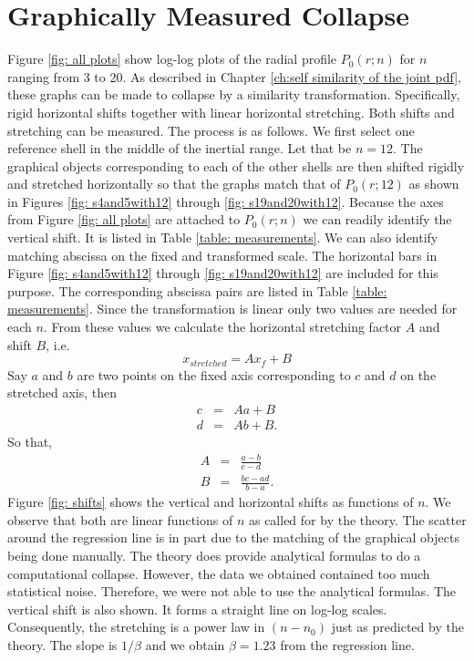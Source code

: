 \vspace{2in}

\section{Graphically Measured Collapse}

Figure \ref{fig: all plots} show log-log plots of the radial profile $P_0(r;n)$ for $n$ ranging from 3 to 20.  As described in Chapter \ref{ch:self similarity of the joint pdf}, these graphs can be made to collapse by a similarity transformation.  Specifically, rigid horizontal shifts together with linear horizontal stretching.  Both shifts and stretching can be measured.  The process is as follows.  We first select one reference shell in the middle of the inertial range.  Let that be $n=12$.  The graphical objects corresponding to each of the other shells are then shifted rigidly and stretched horizontally so that the graphs match that of $P_0(r;12)$ as shown in Figures \ref{fig: s4and5with12} through \ref{fig: s19and20with12}.  Because the axes from Figure \ref{fig: all plots} are attached to $P_0(r;n)$ we can readily identify the vertical shift.  It is listed in Table \ref{table: measurements}.  We can also identify matching abscissa on the fixed and transformed scale.  The horizontal bars in Figure \ref{fig: s4and5with12} through \ref{fig: s19and20with12} are included for this purpose.  The corresponding abscissa pairs are listed in Table \ref{table: measurements}.  Since the transformation is linear only two values are needed for each $n$.  From these values we calculate the horizontal stretching factor $A$ and shift $B$, i.e.
\begin{equation}
	x_{stretched} = Ax_{f} + B
\end{equation}
Say $a$ and $b$ are two points on the fixed axis corresponding to $c$ and $d$ on the stretched axis, then
\begin{eqnarray}
	c & = & Aa + B \\
	d & = & Ab + B.
\end{eqnarray}
So that,
\begin{eqnarray}
	A & = & \frac{a-b}{c-d} \\
	B & = & \frac{bc-ad}{b-a}.
\end{eqnarray}
Figure \ref{fig: shifts} shows the vertical and horizontal shifts as functions of $n$.  We observe that both are linear functions of $n$ as called for by the theory.  The scatter around the regression line is in part due to the matching of the graphical objects being done manually.  The theory does provide analytical formulas to do a computational collapse.  However, the data we obtained contained too much statistical noise.  Therefore, we were not able to use the analytical formulas.  The vertical shift is also shown.  It forms a straight line on log-log scales.  Consequently, the stretching is a power law in $(n-n_0)$ just as predicted by the theory.  The slope is $1/\beta$ and we obtain $\beta = 1.23$ from the regression line.


